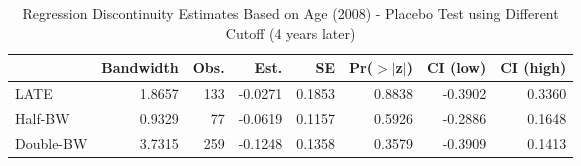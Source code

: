 \begin{table}[ht]
\centering
\begin{tabular}{lrrrrrrr}
  \hline
 & Bandwidth & Obs. & Est. & SE & Pr($>$$|$z$|$) & CI (low) & CI (high) \\ 
  \hline
LATE & 1.8657 & 133 & -0.0271 & 0.1853 & 0.8838 & -0.3902 & 0.3360 \\ 
  Half-BW & 0.9329 & 77 & -0.0619 & 0.1157 & 0.5926 & -0.2886 & 0.1648 \\ 
  Double-BW & 3.7315 & 259 & -0.1248 & 0.1358 & 0.3579 & -0.3909 & 0.1413 \\ 
   \hline
\end{tabular}
\caption{Regression Discontinuity Estimates Based on Age (2008) - Placebo Test using Different Cutoff (4 years later)} 
\label{tab:rd2008y_plac}
\end{table}
